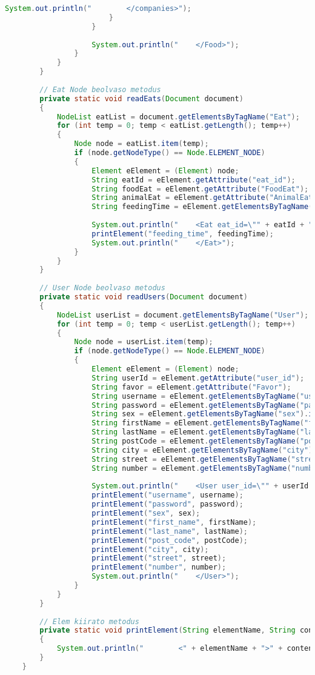 \documentclass[12pt]{report}
\begin{document}
\begin{lstlisting}[caption={DOMReadKLNSPG.java} adatolvasó program, language=Java]
							System.out.println("        </companies>");
						}
					}
					
					System.out.println("    </Food>");
				}
			}
		}    
		
		// Eat Node beolvaso metodus
		private static void readEats(Document document) 
		{
			NodeList eatList = document.getElementsByTagName("Eat");
			for (int temp = 0; temp < eatList.getLength(); temp++) 
			{
				Node node = eatList.item(temp);
				if (node.getNodeType() == Node.ELEMENT_NODE) 
				{
					Element eElement = (Element) node;
					String eatId = eElement.getAttribute("eat_id");
					String foodEat = eElement.getAttribute("FoodEat");
					String animalEat = eElement.getAttribute("AnimalEat");
					String feedingTime = eElement.getElementsByTagName("feeding_time").item(0).getTextContent();
					
					System.out.println("    <Eat eat_id=\"" + eatId + "\" FoodEat=\"" + foodEat + "\" AnimalEat=\"" + animalEat + "\">");
					printElement("feeding_time", feedingTime);
					System.out.println("    </Eat>");
				}
			}
		}
		
		// User Node beolvaso metodus
		private static void readUsers(Document document)
		{
			NodeList userList = document.getElementsByTagName("User");
			for (int temp = 0; temp < userList.getLength(); temp++) 
			{
				Node node = userList.item(temp);
				if (node.getNodeType() == Node.ELEMENT_NODE) 
				{
					Element eElement = (Element) node;
					String userId = eElement.getAttribute("user_id");
					String favor = eElement.getAttribute("Favor");
					String username = eElement.getElementsByTagName("username").item(0).getTextContent();
					String password = eElement.getElementsByTagName("password").item(0).getTextContent();
					String sex = eElement.getElementsByTagName("sex").item(0).getTextContent();
					String firstName = eElement.getElementsByTagName("first_name").item(0).getTextContent();
					String lastName = eElement.getElementsByTagName("last_name").item(0).getTextContent();
					String postCode = eElement.getElementsByTagName("post_code").item(0).getTextContent();
					String city = eElement.getElementsByTagName("city").item(0).getTextContent();
					String street = eElement.getElementsByTagName("street").item(0).getTextContent();
					String number = eElement.getElementsByTagName("number").item(0).getTextContent();
					
					System.out.println("    <User user_id=\"" + userId + "\" Favor=\"" + favor + "\">");
					printElement("username", username);
					printElement("password", password);
					printElement("sex", sex);
					printElement("first_name", firstName);
					printElement("last_name", lastName);
					printElement("post_code", postCode);
					printElement("city", city);
					printElement("street", street);
					printElement("number", number);
					System.out.println("    </User>");
				}
			}
		}
		
		// Elem kiirato metodus
		private static void printElement(String elementName, String content)
		{
			System.out.println("        <" + elementName + ">" + content + "</" + elementName + ">");
		}
	}
\end{lstlisting}
\end{document}
